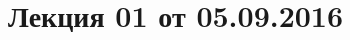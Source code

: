 \documentclass[a4paper, 12pt]{article}
\begin{document}
\pagestyle{fancy}
\section{Лекция 01 от 05.09.2016}
\end{document}
